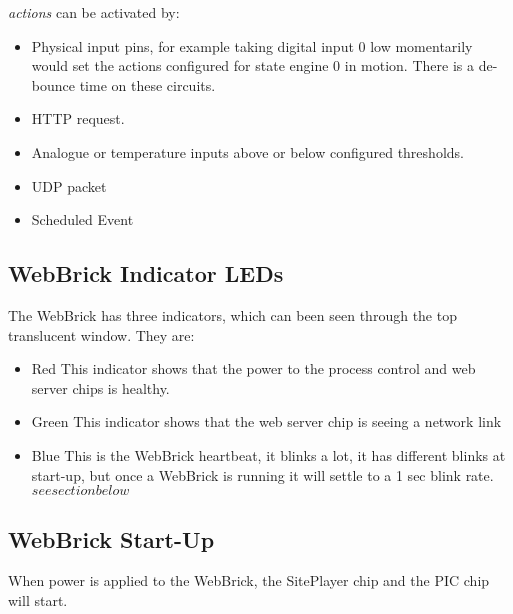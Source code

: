 {\em actions} can be activated by:

\begin{itemize}

\item

Physical input pins, for example taking digital input 0 low momentarily would set the actions configured for 
state engine 0 in motion.  There is a de-bounce time on these circuits.
\item

HTTP request. 

\item

Analogue or temperature inputs above or below configured thresholds.

\item

UDP packet
\item

Scheduled Event

\end{itemize}

\subsection{WebBrick Indicator LEDs}

	The WebBrick has three indicators, which can been seen through the top translucent window.  They are:
	
	\begin{itemize}
		\item{Red} This indicator shows that the power to the process control and web server chips is healthy.
		\item{Green} This indicator shows that the web server chip is seeing a network link
		\item{Blue} This is the WebBrick heartbeat, it blinks a lot, it has different blinks at start-up, but once
				a WebBrick is running it will settle to a 1 sec blink rate. \(see section below\)
	\end{itemize}
	

\subsection{WebBrick Start-Up}

When power is applied to the WebBrick, the SitePlayer chip and the PIC chip will start.

